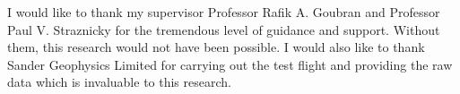 I would like to thank my supervisor Professor Rafik A. Goubran and
Professor Paul V. Straznicky for the tremendous level of guidance and
support. Without them, this research would not have been possible. I
would also like to thank Sander Geophysics Limited for carrying out
the test flight and providing the raw data which is invaluable to this
research. 
